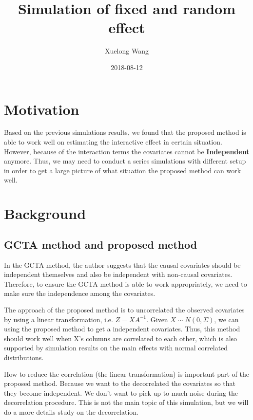 \documentclass[]{article}
\title{Simulation of fixed and random effect}
\author{Xuelong Wang}
\date{2018-08-12}
\begin{document}
\maketitle

{
\setcounter{tocdepth}{2}
\tableofcontents
}
\section{Motivation}\label{motivation}

Based on the previous simulations results, we found that the proposed
method is able to work well on estimating the interactive effect in
certain situation. However, because of the interaction terms the
covariates cannot be \textbf{Independent} anymore. Thus, we may need to
conduct a series simulations with different setup in order to get a
large picture of what situation the proposed method can work well.

\section{Background}\label{background}

\subsection{GCTA method and proposed
method}\label{gcta-method-and-proposed-method}

In the GCTA method, the author suggests that the causal covariates
should be independent themselves and also be independent with non-causal
covariates. Therefore, to ensure the GCTA method is able to work
appropriately, we need to make sure the independence among the
covariates.

The approach of the proposed method is to uncorrelated the observed
covariates by using a linear transformation, i.e. \(Z = XA^{-1}\). Given
\(X \sim N(0, \Sigma)\), we can using the proposed method to get a
independent covariates. Thus, this method should work well when X's
columns are correlated to each other, which is also supported by
simulation results on the main effects with normal correlated
distributions.

How to reduce the correlation (the linear transformation) is important
part of the proposed method. Because we want to the decorrelated the
covariates so that they become independent. We don't want to pick up to
much noise during the decorrelation procedure. This is not the main
topic of this simulation, but we will do a more details study on the
decorrelation.
\end{document}
